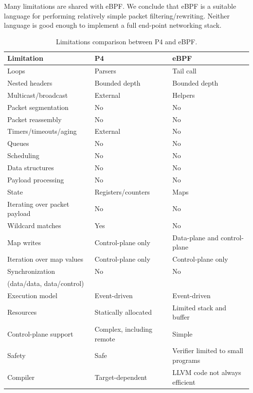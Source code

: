 Many limitations are shared with eBPF.  We conclude that eBPF is a
suitable language for performing relatively simple packet
filtering/rewriting.  Neither language is good enough to implement a
full end-point networking stack.

\begin{table}[h]
  \footnotesize
  \begin{center}
  \begin{tabular}{|l|l|l|} \hline
    \textbf{Limitation} & \textbf{P4} & \textbf{eBPF} \\ \hline \hline
    Loops & Parsers & Tail call \\ \hline
    Nested headers & Bounded depth & Bounded depth \\ \hline
    Multicast/broadcast & External & Helpers \\ \hline
    Packet segmentation & No & No \\ \hline
    Packet reassembly &	No & No \\ \hline
    Timers/timeouts/aging & External & No \\ \hline
    Queues & No & No \\ \hline
    Scheduling & No & No \\ \hline
    Data structures & No & No \\ \hline
    Payload processing & No & No \\ \hline
    State & Registers/counters & Maps \\ \hline
    Iterating over packet payload & No & No \\ \hline
    Wildcard matches & Yes & No \\ \hline
    Map writes & Control-plane only & Data-plane and control-plane \\ \hline
    Iteration over map values & Control-plane only & Control-plane only \\ \hline
    Synchronization & No & No \\
    (data/data, data/control) & & \\ \hline
    Execution model & Event-driven & Event-driven \\ \hline
    Resources & Statically allocated & Limited stack and buffer \\ \hline
    Control-plane support & Complex, including remote & Simple \\ \hline
    Safety & Safe & Verifier limited to small programs \\ \hline
    Compiler & Target-dependent & LLVM code not always efficient \\ \hline
  \end{tabular}
  \caption{Limitations comparison between P4 and eBPF.}\label{table:limitations}
  \end{center}
\end{table}
